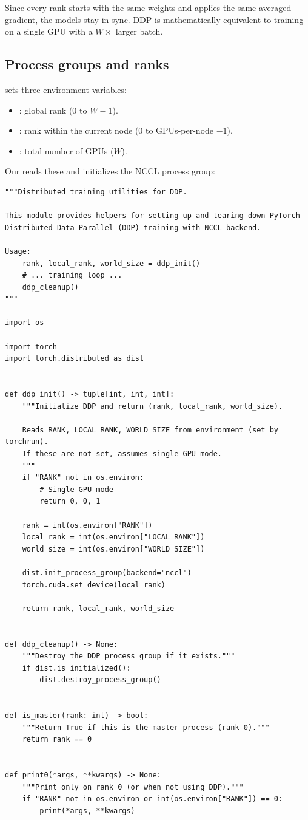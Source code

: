Since every rank starts with the same weights and applies the same averaged gradient, the models stay in sync.  DDP is mathematically equivalent to training on a single GPU with a $W\times$ larger batch.

\subsection{Process groups and ranks}

 sets three environment variables:
\begin{itemize}
  \item {}: global rank (0 to $W-1$).
  \item {}: rank within the current node (0 to GPUs-per-node $- 1$).
  \item {}: total number of GPUs ($W$).
\end{itemize}

Our  reads these and initializes the NCCL process group:

\begin{lstlisting}
"""Distributed training utilities for DDP.

This module provides helpers for setting up and tearing down PyTorch
Distributed Data Parallel (DDP) training with NCCL backend.

Usage:
    rank, local_rank, world_size = ddp_init()
    # ... training loop ...
    ddp_cleanup()
"""

import os

import torch
import torch.distributed as dist


def ddp_init() -> tuple[int, int, int]:
    """Initialize DDP and return (rank, local_rank, world_size).

    Reads RANK, LOCAL_RANK, WORLD_SIZE from environment (set by torchrun).
    If these are not set, assumes single-GPU mode.
    """
    if "RANK" not in os.environ:
        # Single-GPU mode
        return 0, 0, 1

    rank = int(os.environ["RANK"])
    local_rank = int(os.environ["LOCAL_RANK"])
    world_size = int(os.environ["WORLD_SIZE"])

    dist.init_process_group(backend="nccl")
    torch.cuda.set_device(local_rank)

    return rank, local_rank, world_size


def ddp_cleanup() -> None:
    """Destroy the DDP process group if it exists."""
    if dist.is_initialized():
        dist.destroy_process_group()


def is_master(rank: int) -> bool:
    """Return True if this is the master process (rank 0)."""
    return rank == 0


def print0(*args, **kwargs) -> None:
    """Print only on rank 0 (or when not using DDP)."""
    if "RANK" not in os.environ or int(os.environ["RANK"]) == 0:
        print(*args, **kwargs)
\end{lstlisting}


